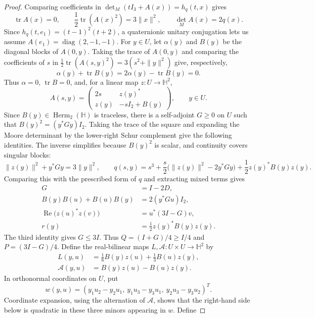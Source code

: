 \documentclass[11pt,onecolumn]{article}
\theoremstyle{blueplain}
\theoremstyle{bluedefinition}
\theoremstyle{bluedefinition}
\newcommand{\tr}{\operatorname{tr}}
\begin{document}
\begin{proof}
Comparing coefficients in $\det_M(tI_3+A(x))=h_q(t,x)$ gives
\[
 \tr A(x)=0,\qquad
 \frac12\tr(A(x)^2)=3\|x\|^2,
 \qquad \det_M A(x)=2q(x).
\]
Since $h_q(t,e_1)=(t-1)^2(t+2)$, a quaternionic unitary conjugation
lets us assume $A(e_1)=\operatorname{diag}(2,-1,-1)$.
For $y\in U$, let $\alpha(y)$ and $B(y)$ be the diagonal blocks of
$A(0,y)$.  Taking the trace of $A(0,y)$ and comparing the coefficients
of $s$ in $\frac12\tr(A(s,y)^2)=3(s^2+\|y\|^2)$ give, respectively,
$$\alpha(y)+\tr B(y)=2\alpha(y)-\tr B(y)=0.$$
Thus $\alpha=0$, $\tr B=0$, and, for a linear map $z\colon U\to\mathbb H^2$,
\[
 A(s,y)=
 \begin{pmatrix}
  2s&z(y)^*\\
  z(y)&-sI_2+B(y)
 \end{pmatrix},
 \qquad y\in U.
\]
Since $B(y)\in\operatorname{Herm}_2(\mathbb H)$ is traceless, there is a
self-adjoint $G\geqslant0$ on $U$ such that
$B(y)^2=(y^*Gy)I_2$.  Taking the trace of the square and expanding the
Moore determinant by the lower-right Schur complement give the following
identities.  The inverse simplifies because $B(y)^2$ is scalar, and
continuity covers singular blocks:
\[
 \|z(y)\|^2+y^*Gy=3\|y\|^2,
 \qquad
 q(s,y)=s^3+\frac{s}{2}
 \bigl(\|z(y)\|^2-2y^*Gy\bigr)
 +\frac12z(y)^*B(y)z(y).
\]
Comparing this with the prescribed form of $q$ and extracting mixed terms gives
\begin{equation}\label{eq:defect-identities}
 \begin{aligned}
 G&=I-2D,\\
 B(y)B(u)+B(u)B(y)&=2(y^*Gu)I_2,\\
 \operatorname{Re}\bigl(z(u)^*z(v)\bigr)
   &=u^*(3I-G)v,\\
 r(y)&=\frac12z(y)^*B(y)z(y).
 \end{aligned}
\end{equation}
The third identity gives $G\leqslant3I$.  Thus
$Q=(I+G)/4\geqslant I/4$ and $P=(3I-G)/4$.
Define the real-bilinear maps $L,\mathcal A\colon U\times U\to\mathbb H^2$ by
\[
 \begin{aligned}
 L(y,u)&=\frac16B(y)z(u)+\frac13B(u)z(y),\\
 \mathcal A(y,u)&=B(y)z(u)-B(u)z(y).
 \end{aligned}
\]
In orthonormal coordinates on $U$, put
\[
 w(y,u)=(y_1u_2-y_2u_1,\ y_1u_3-y_3u_1,\ y_2u_3-y_3u_2)^T.
\]
Coordinate expansion, using the alternation of $\mathcal A$, shows that
the right-hand side below is quadratic in these three minors appearing in $w$.  Define

\end{proof}
\end{document}
